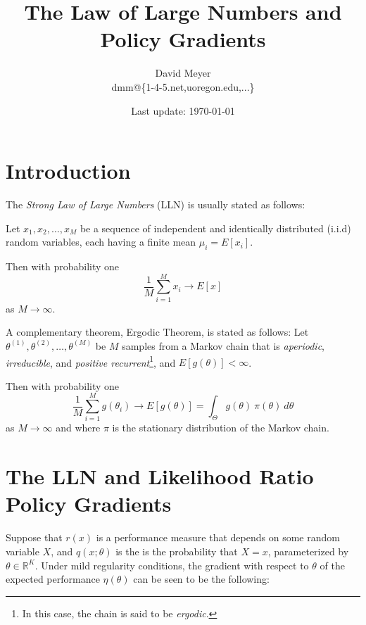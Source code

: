 \documentclass[11pt, oneside]{article}   	%
\title{The Law of Large Numbers and Policy Gradients}
\author{David Meyer \\ dmm@\{1-4-5.net,uoregon.edu,...\}}
\date{Last update: \today}							%
\begin{document}
\maketitle

\section{Introduction} 

The \emph{Strong Law of Large Numbers} (LLN) is usually stated as follows: 

\bigskip
\noindent
Let $x_{1}, x_{2}, \hdots, x_{M}$ be a sequence of independent and identically distributed (i.i.d) random variables, each having a finite mean $\mu_i = E[x_{i}]$. 

\bigskip
\noindent
Then with probability one
\begin{equation}
\frac{1}{M}\sum\limits_{i=1}^{M} x_i \rightarrow E[x]
\end{equation}
as  $M \rightarrow \infty$.

\bigskip
\noindent
A complementary theorem, Ergodic Theorem, is stated as follows:
\bigskip
\noindent
Let $\theta^{(1)}, \theta^{(2)}, \hdots, \theta^{(M)}$ be $M$ samples from a Markov chain that is \emph{aperiodic}, \emph{irreducible}, and \emph{positive recurrent}\footnote{In this case, the chain is said to be \emph{ergodic}.}, and $E[g(\theta)] < \infty$.

\bigskip
\noindent
Then with probability one
\begin{equation}
\frac{1}{M}\sum\limits_{i = 1}^{M} g(\theta_{i}) \rightarrow E[g(\theta)]  = \int_{\Theta}^{}g(\theta) \: \pi(\theta) \:d\theta
\end{equation}
as $M \rightarrow \infty$ and where $\pi$ is the stationary distribution of the Markov chain.

\section{The LLN and Likelihood Ratio Policy Gradients} 
Suppose that $r(x)$ is a performance measure that depends on some random variable $X$, and 
$q(x; \theta)$ is the is the probability that $X = x$, 
parameterized by $\theta \in \mathbb{R}^K$. Under mild regularity conditions, the gradient with respect to $\theta$ 
of the expected performance $\eta(\theta)$ can be seen to be the following:
\end{document}
